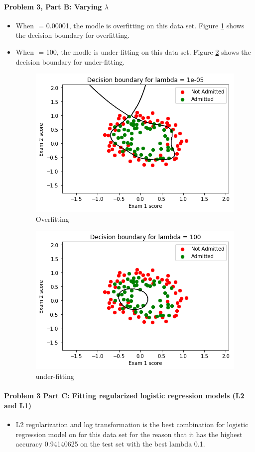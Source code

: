 \documentclass[paper=a4, fontsize=11pt]{scrartcl} %
\numberwithin{equation}{section} %
\numberwithin{figure}{section} %
\numberwithin{table}{section} %
\begin{document}
\paragraph{\textbf{Problem 3, Part B: Varying $\lambda$}}
\begin{itemize}
	\item When $\label{key}$ = 0.00001, the modle is overfitting on this data set. Figure \ref{fig:overfitting} shows the decision boundary for overfitting.
	
	\item When $\label{key}$ = 100, the modle is under-fitting on this data set. Figure \ref{fig:under-fitting} shows the decision boundary for under-fitting.
	
	\begin{figure}
		\centering
		\includegraphics[scale=0.6]{fig4_sk_overfitting.png}
		\caption{Overfitting}
		\label{fig:overfitting}
	\end{figure}
	\begin{figure}
		\centering
		\includegraphics[scale=0.6]{fig4_sk_under-fitting.png}
		\caption{under-fitting}
		\label{fig:under-fitting}
	\end{figure}
\end{itemize}

\paragraph{\textbf{Problem 3 Part C: Fitting regularized logistic regression models (L2 and L1)}}
\begin{itemize}
	\item L2 regularization and log transformation is the best combination for logistic regression model on for this data set for the reason that it has the highest accuracy 0.94140625 on the test set with the best lambda 0.1.
\end{itemize}
\end{document}
